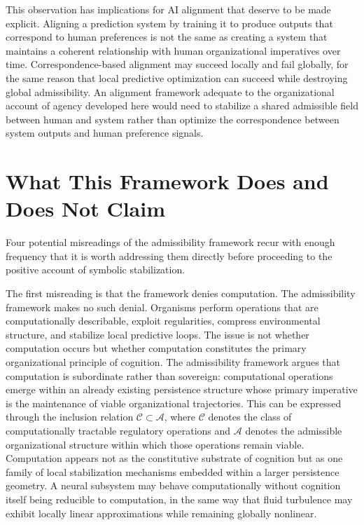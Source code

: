 \documentclass[12pt,a4paper]{report}
\theoremstyle{flyxion}
\begin{document}
This observation has implications for AI alignment that deserve to be made explicit. Aligning a prediction system by training it to produce outputs that correspond to human preferences is not the same as creating a system that maintains a coherent relationship with human organizational imperatives over time. Correspondence-based alignment may succeed locally and fail globally, for the same reason that local predictive optimization can succeed while destroying global admissibility. An alignment framework adequate to the organizational account of agency developed here would need to stabilize a shared admissible field between human and system rather than optimize the correspondence between system outputs and human preference signals.

\section{What This Framework Does and Does Not Claim}

Four potential misreadings of the admissibility framework recur with enough frequency that it is worth addressing them directly before proceeding to the positive account of symbolic stabilization.

The first misreading is that the framework denies computation. The admissibility framework makes no such denial. Organisms perform operations that are computationally describable, exploit regularities, compress environmental structure, and stabilize local predictive loops. The issue is not whether computation occurs but whether computation constitutes the primary organizational principle of cognition. The admissibility framework argues that computation is subordinate rather than sovereign: computational operations emerge within an already existing persistence structure whose primary imperative is the maintenance of viable organizational trajectories. This can be expressed through the inclusion relation $\mathcal{C} \subset \mathcal{A}$, where $\mathcal{C}$ denotes the class of computationally tractable regulatory operations and $\mathcal{A}$ denotes the admissible organizational structure within which those operations remain viable. Computation appears not as the constitutive substrate of cognition but as one family of local stabilization mechanisms embedded within a larger persistence geometry. A neural subsystem may behave computationally without cognition itself being reducible to computation, in the same way that fluid turbulence may exhibit locally linear approximations while remaining globally nonlinear.
\end{document}
